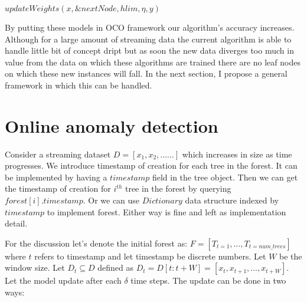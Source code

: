 \vspace{1em}
\begin{algorithm}[H]
    \caption{$updateWeights(x, T, \eta, y)$}\label{alg:update-weights-pidforest}
    \DontPrintSemicolon
    \SetAlgoLined


    
    $updateWeights(x, \&nextNode, hlim, \eta, y)$
\end{algorithm}
\pagebreak

By putting these models in OCO framework our algorithm's accuracy increases. 
Although for a large amount of streaming data the current algorithm is able to handle little bit of concept dript but as soon the new data diverges too much in value from the data on which these algorithms are trained there are no leaf nodes on which these new instances will fall. 
In the next section, I propose a general framework in which this can be handled.

\section{Online anomaly detection}
\label{sec:online-anomaly-detection}


Consider a streaming dataset $D = [x_1, x_2, \dots \dots  ]$ which increases in size as time progresses. We introduce timestamp of creation for each tree in the forest. It can be implemented by having a $timestamp$ field in the tree object. Then we can get the timestamp of creation for $i^{th}$ tree in the forest by querying $forest[i].timestamp$. Or we can use $Dictionary$ data structure indexed by $timestamp$ to implement forest. Either way is fine and left as implementation detail.

For the discussion let's denote the initial forest as: $F = [T_{t=1}, \dots, T_{t=num\_trees}]$ where $t$ refers to timestamp and let timestamp be discrete numbers. Let $W$ be the window size. Let $D_{t} \subseteq D$ defined as $D_{t} = D[t:t+W] = [x_t, x_{t+1}, \dots, x_{t+W}]$. Let the model update after each $\delta$ time steps. The update can be done in two ways:

